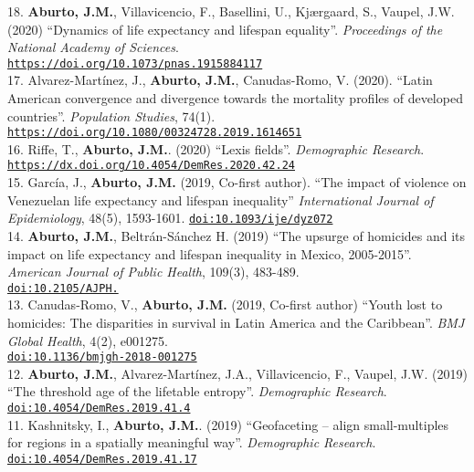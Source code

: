 \documentclass[12pt]{article}
\providecommand*\url[1]{\href{#1}{#1}}
\renewcommand*\url[1]{\href{#1}{\texttt{#1}}}
\begin{document}
18. \textbf{Aburto, J.M.},  Villavicencio, F., Basellini, U., Kj{\ae}rgaard, S., Vaupel, J.W. (2020) ``Dynamics of life expectancy and lifespan equality''.  \textit{Proceedings of the National Academy of Sciences}.\\ \url{https://doi.org/10.1073/pnas.1915884117} \\

17. Alvarez-Mart\'inez, J., \textbf{Aburto, J.M.}, Canudas-Romo, V. (2020). ``Latin American convergence and divergence towards the mortality profiles of developed countries''. \textit{Population Studies}, 74(1).\\ \url{https://doi.org/10.1080/00324728.2019.1614651} \\

16. Riffe, T., \textbf{Aburto, J.M.}. (2020) ``Lexis fields''. \textit{Demographic Research}. \\ 
 \url{https://dx.doi.org/10.4054/DemRes.2020.42.24} \\

15. Garc\'ia, J., \textbf{Aburto, J.M.} (2019, Co-first author). ``The impact of violence on Venezuelan life expectancy and lifespan inequality''  \textit{International Journal of Epidemiology}, 48(5), 1593-1601. \url{doi:10.1093/ije/dyz072}\\

14. \textbf{Aburto, J.M.}, Beltr\'an-S\'anchez H. (2019) ``The upsurge of homicides and its impact on life expectancy and lifespan inequality in Mexico, 2005-2015''. \textit{ American Journal of Public Health}, 109(3), 483-489. \\ \url{doi:10.2105/AJPH.}\\

13. Canudas-Romo, V., \textbf{Aburto, J.M.} (2019, Co-first author) ``Youth lost to homicides: The disparities in survival in Latin America and the Caribbean''. \textit{BMJ Global Health}, 4(2), e001275. \\ \url{doi:10.1136/bmjgh-2018-001275}\\

12. \textbf{Aburto, J.M.}, Alvarez-Mart\'inez, J.A., Villavicencio, F., Vaupel, J.W. (2019) ``The threshold age of the lifetable entropy''.  \textit{Demographic Research}. \url{doi:10.4054/DemRes.2019.41.4}\\

11. Kashnitsky, I., \textbf{Aburto, J.M.}. (2019) ``Geofaceting – align small-multiples for regions in a spatially meaningful way''. \textit{Demographic Research}. \url{doi:10.4054/DemRes.2019.41.17}\\
\end{document}
